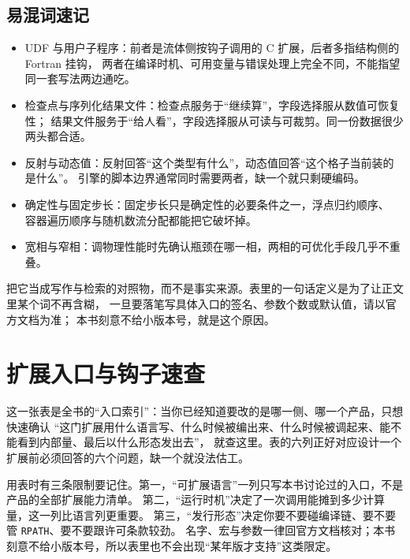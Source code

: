\documentclass[12pt,a4paper,fontset=fandol]{ctexbook}
\newcommand{\Tp}[1]{\texttt{#1}}
\newcommand{\Lang}[1]{\textsf{#1}}
\newcommand{\CL}{\Lang{C}}
\begin{document}
\section{易混词速记}

\begin{itemize}
\item UDF 与用户子程序：前者是流体侧按钩子调用的 \CL{} 扩展，后者多指结构侧的 Fortran 挂钩，
  两者在编译时机、可用变量与错误处理上完全不同，不能指望同一套写法两边通吃。
\item 检查点与序列化结果文件：检查点服务于``继续算''，字段选择服从数值可恢复性；
  结果文件服务于``给人看''，字段选择服从可读与可裁剪。同一份数据很少两头都合适。
\item 反射与动态值：反射回答``这个类型有什么''，动态值回答``这个格子当前装的是什么''。
  引擎的脚本边界通常同时需要两者，缺一个就只剩硬编码。
\item 确定性与固定步长：固定步长只是确定性的必要条件之一，浮点归约顺序、
  容器遍历顺序与随机数流分配都能把它破坏掉。
\item 宽相与窄相：调物理性能时先确认瓶颈在哪一相，两相的可优化手段几乎不重叠。
\end{itemize}

\begin{guideline}[title={读这张表的正确方式}]
把它当成写作与检索的对照物，而不是事实来源。表里的一句话定义是为了让正文里某个词不再含糊，
一旦要落笔写具体入口的签名、参数个数或默认值，请以官方文档为准；
本书刻意不给小版本号，就是这个原因。
\end{guideline}

\chapter{扩展入口与钩子速查}
\label{ch:apB-cheatsheet}

这一张表是全书的``入口索引''：当你已经知道要改的是哪一侧、哪一个产品，只想快速确认
``这门扩展用什么语言写、什么时候被编出来、什么时候被调起来、能不能看到内部量、最后以什么形态发出去''，
就查这里。表的六列正好对应设计一个扩展前必须回答的六个问题，缺一个就没法估工。

用表时有三条限制要记住。第一，``可扩展语言''一列只写本书讨论过的入口，不是产品的全部扩展能力清单。
第二，``运行时机''决定了一次调用能摊到多少计算量，这一列比语言列更重要。
第三，``发行形态''决定你要不要碰编译链、要不要管 \Tp{RPATH}、要不要跟许可条款较劲。
名字、宏与参数一律回官方文档核对；本书刻意不给小版本号，所以表里也不会出现``某年版才支持''这类限定。
\end{document}

